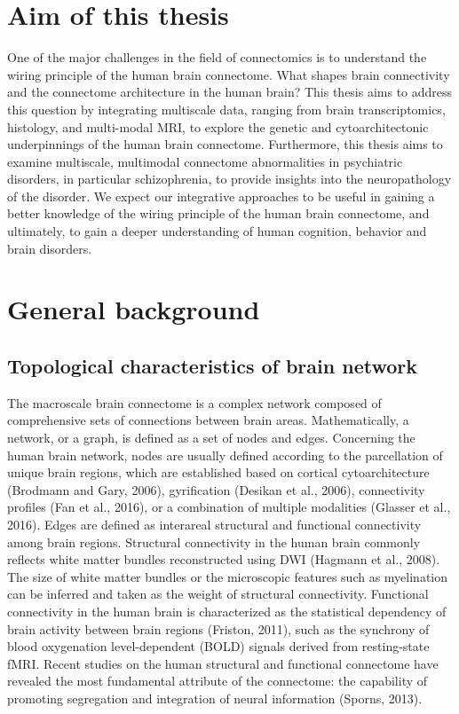 \begin{refsection}
\section*{Aim of this thesis}
One of the major challenges in the field of connectomics is to understand the wiring principle of the human brain connectome. What shapes brain connectivity and the connectome architecture in the human brain? This thesis aims to address this question by integrating multiscale data, ranging from brain transcriptomics, histology, and multi-modal MRI, to explore the genetic and cytoarchitectonic underpinnings of the human brain connectome. Furthermore, this thesis aims to examine multiscale, multimodal connectome abnormalities in psychiatric disorders, in particular schizophrenia, to provide insights into the neuropathology of the disorder. We expect our integrative approaches to be useful in gaining a better knowledge of the wiring principle of the human brain connectome, and ultimately, to gain a deeper understanding of human cognition, behavior and brain disorders.

\section*{General background}
\subsection*{Topological characteristics of brain network}
The macroscale brain connectome is a complex network composed of comprehensive sets of connections between brain areas. Mathematically, a network, or a graph, is defined as a set of nodes and edges. Concerning the human brain network, nodes are usually defined according to the parcellation of unique brain regions, which are established based on cortical cytoarchitecture (Brodmann and Gary, 2006), gyrification (Desikan et al., 2006), connectivity profiles (Fan et al., 2016), or a combination of multiple modalities (Glasser et al., 2016). Edges are defined as interareal structural and functional connectivity among brain regions. Structural connectivity in the human brain commonly reflects white matter bundles reconstructed using DWI (Hagmann et al., 2008). The size of white matter bundles or the microscopic features such as myelination can be inferred and taken as the weight of structural connectivity. Functional connectivity in the human brain is characterized as the statistical dependency of brain activity between brain regions (Friston, 2011), such as the synchrony of blood oxygenation level-dependent (BOLD) signals derived from resting-state fMRI. Recent studies on the human structural and functional connectome have revealed the most fundamental attribute of the connectome: the capability of promoting segregation and integration of neural information (Sporns, 2013).


\end{refsection}
